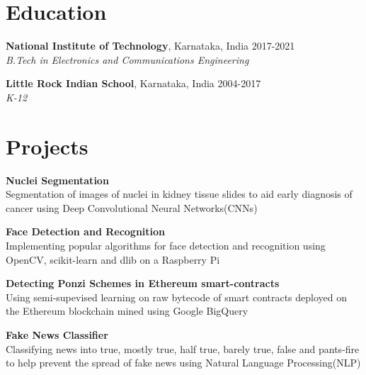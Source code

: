 \documentclass[margin]{res}
\begin{document}
  \address{National Institute of Technology\\Karnataka, India\\linkedin/in/rshwndsz}
  \address{(91+) 9611212081\\russel.171ec143@nitk.edu.in\\github.com/rshwndsz}

  \begin{resume}
    \section{Education}
      \textbf{National Institute of Technology}, Karnataka, India\hfill 
      2017-2021
      \\
      {\sl B.Tech in Electronics and Communications Engineering}\hfill 
      

      \textbf{Little Rock Indian School}, Karnataka, India\hfill
      2004-2017
      \\
      {\sl K-12}\hfill

    \section{Projects}
      \par
      \textbf{Nuclei Segmentation}\\
      Segmentation of images of nuclei in kidney tissue slides to aid early diagnosis of cancer using Deep Convolutional Neural Networks(CNNs)

      \par
      \textbf{Face Detection and Recognition}\\
      Implementing popular algorithms for face detection and recognition using OpenCV, scikit-learn and dlib on a Raspberry Pi
      
      \par
      \textbf{Detecting Ponzi Schemes in Ethereum smart-contracts}\\
      Using semi-supevised learning on raw bytecode of smart contracts deployed on the Ethereum blockchain mined using Google BigQuery

      \par
      \textbf{Fake News Classifier}\\
      Classifying news into true, mostly true, half true, barely true, false and pants-fire to help prevent the spread of fake news using Natural Language Processing(NLP)


\end{resume}
\end{document}

